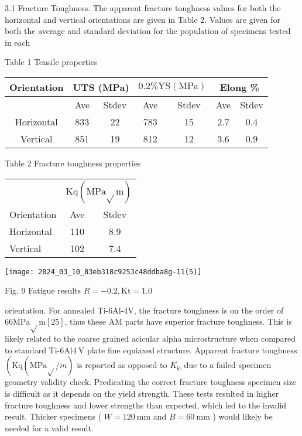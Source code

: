 \documentclass[10pt]{article}
\begin{document}
3.1 Fracture Toughness. The apparent fracture toughness values for both the horizontal and vertical orientations are given in Table 2. Values are given for both the average and standard deviation for the population of specimens tested in each

Table 1 Tensile properties

\begin{center}
\begin{tabular}{|c|c|c|c|c|c|c|}
\hline
\multirow[b]{2}{*}{Orientation} & \multicolumn{2}{|c|}{UTS (MPa)} & \multicolumn{2}{|c|}{$0.2 \% \mathrm{YS}(\mathrm{MPa})$} & \multicolumn{2}{|c|}{Elong \%} \\
\hline
 & Ave & Stdev & Ave & Stdev & Ave & Stdev \\
\hline
Horizontal & 833 & 22 & 783 & 15 & 2.7 & 0.4 \\
\hline
Vertical & 851 & 19 & 812 & 12 & 3.6 & 0.9 \\
\hline
\end{tabular}
\end{center}

Table 2 Fracture toughness properties

\begin{center}
\begin{tabular}{lcc}
\hline\hline
 & \multicolumn{2}{c}{$\mathrm{Kq}(\mathrm{MPa} \sqrt{ } \mathrm{m})$} \\
\cline { 2 - 4 }
Orientation & Ave & Stdev \\
\hline
Horizontal & 110 & 8.9 \\
Vertical & 102 & 7.4 \\
\hline\hline
\end{tabular}
\end{center}

\begin{center}
\texttt{[image: 2024\_03\_10\_83eb318c9253c48ddba8g-11(5)]}
\end{center}

Fig. 9 Fatigue results $R=-0.2, \mathrm{Kt}=1.0$

orientation. For annealed Ti-6Al-4V, the fracture toughness is on the order of $66 \mathrm{MPa} \sqrt{ } \mathrm{m}[25]$, thus these $\mathrm{AM}$ parts have superior fracture toughness. This is likely related to the coarse grained acicular alpha microstructure when compared to standard Ti-6Al$4 \mathrm{~V}$ plate fine equiaxed structure. Apparent fracture toughness $\left(\mathrm{Kq}(\mathrm{MPa} \sqrt{ } / m)\right.$ is reported as opposed to $K_{\mathrm{ic}}$ due to a failed specimen geometry validity check. Predicating the correct fracture toughness specimen size is difficult as it depends on the yield strength. These tests resulted in higher fracture toughness and lower strengths than expected, which led to the invalid result. Thicker specimens ( $W=120 \mathrm{~mm}$ and $B=60 \mathrm{~mm}$ ) would likely be needed for a valid result.
\end{document}
